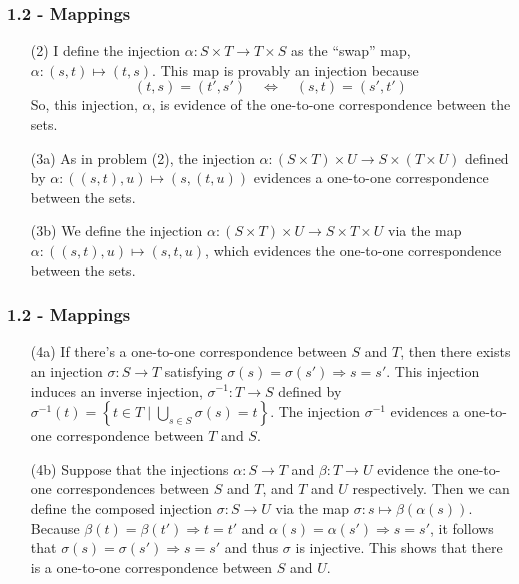 \documentclass{beamer}
\begin{document}
\begin{frame}
\frametitle{1.2 - Mappings}
\small
\begin{enumerate}
	\item[(2)] I define the injection $\alpha: S\times T\to T\times S$ as the ``swap'' map, $\alpha: (s, t)\mapsto(t,s)$. This map is provably an injection because
	\begin{equation*}
	(t, s) = (t', s')\quad\Leftrightarrow\quad(s, t) = (s', t')
	\end{equation*}
	So, this injection, $\alpha$, is evidence of the one-to-one correspondence between the sets.
	\item[(3a)] As in problem (2), the injection $\alpha: (S\times T)\times U\to S\times(T\times U)$ defined by $\alpha: ((s, t), u)\mapsto(s,(t,u))$ evidences a one-to-one correspondence between the sets.
	\item[(3b)] We define the injection $\alpha: (S\times T)\times U\to S\times T\times U$ via the map $\alpha: ((s,t),u)\mapsto(s,t,u)$, which evidences the one-to-one correspondence between the sets.
\end{enumerate}
\end{frame}
\begin{frame}
\frametitle{1.2 - Mappings}
\small
\begin{enumerate}
	\item[(4a)] If there's a one-to-one correspondence between $S$ and $T$, then there exists an injection $\sigma: S\to T$ satisfying $\sigma(s)=\sigma(s')\Rightarrow s = s'$. This injection induces an inverse injection, $\sigma^{-1}: T\to S$ defined by $\sigma^{-1}(t)=\left\{t\in T \mid \bigcup_{s\in S}\sigma(s) = t\right\}$. The injection $\sigma^{-1}$ evidences a one-to-one correspondence between $T$ and $S$.
	\item[(4b)] Suppose that the injections $\alpha: S\to T$ and $\beta: T\to U$ evidence the one-to-one correspondences between $S$ and $T$, and $T$ and $U$ respectively. Then we can define the composed injection $\sigma: S\to U$ via the map $\sigma: s\mapsto \beta(\alpha(s))$. Because $\beta(t)=\beta(t')\Rightarrow t=t'$ and $\alpha(s)=\alpha(s')\Rightarrow s=s'$, it follows that $\sigma(s)=\sigma(s')\Rightarrow s=s'$ and thus $\sigma$ is injective. This shows that there is a one-to-one correspondence between $S$ and $U$.
\end{enumerate}
\end{frame}
\end{document}
